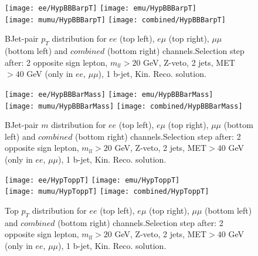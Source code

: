 \clearpage
\newpage




\begin{figure}
  \texttt{[image: ee/HypBBBarpT]}
  \texttt{[image: emu/HypBBBarpT]}\\
  \texttt{[image: mumu/HypBBBarpT]}
  \texttt{[image: combined/HypBBBarpT]}
\caption{BJet-pair $p_T$ distribution for $ee$ (top left), $e\mu$ (top right), $\mu\mu$ (bottom left) and $combined$ (bottom right) channels.\newline Selection step after: 2 opposite sign lepton, $m_{ll}>20$ GeV, Z-veto, 2 jets, MET$>40$ GeV (only in $ee$, $\mu\mu$), 1 b-jet, Kin. Reco. solution.}
\end{figure}

\clearpage
\newpage


\begin{figure}
  \texttt{[image: ee/HypBBBarMass]}
  \texttt{[image: emu/HypBBBarMass]}\\
  \texttt{[image: mumu/HypBBBarMass]}
  \texttt{[image: combined/HypBBBarMass]}
\caption{BJet-pair $m$ distribution for $ee$ (top left), $e\mu$ (top right), $\mu\mu$ (bottom left) and $combined$ (bottom right) channels.\newline Selection step after: 2 opposite sign lepton, $m_{ll}>20$ GeV, Z-veto, 2 jets, MET$>40$ GeV (only in $ee$, $\mu\mu$), 1 b-jet, Kin. Reco. solution.}
\end{figure}

\clearpage
\newpage



\begin{figure}
  \texttt{[image: ee/HypToppT]}
  \texttt{[image: emu/HypToppT]}\\
  \texttt{[image: mumu/HypToppT]}
  \texttt{[image: combined/HypToppT]}
\caption{Top $p_T$ distribution for $ee$ (top left), $e\mu$ (top right), $\mu\mu$ (bottom left) and $combined$ (bottom right) channels.\newline Selection step after: 2 opposite sign lepton, $m_{ll}>20$ GeV, Z-veto, 2 jets, MET$>40$ GeV (only in $ee$, $\mu\mu$), 1 b-jet, Kin. Reco. solution.}
\end{figure}

